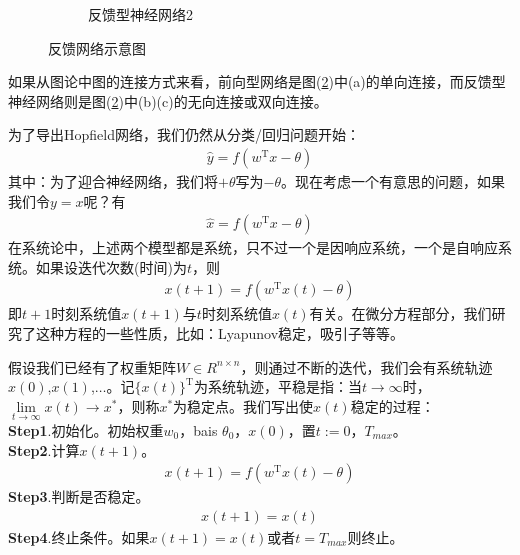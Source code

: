 {\begin{figure}[H]
\begin{subfigure}[b]{0.25\textwidth}
        			\caption{反馈型神经网络2}
        			\label{fig:反馈型神经网络2}
    			\end{subfigure}
    			\caption{反馈网络示意图}\label{fig:反馈网络示意图}
			\end{figure}
            如果从图论中图的连接方式来看，前向型网络是图(\ref{fig:反馈网络示意图})中(a)的单向连接，而反馈型神经网络则是图(\ref{fig:反馈网络示意图})中(b)(c)的无向连接或双向连接。
            \par
            为了导出Hopfield网络，我们仍然从分类/回归问题开始：
            \begin{align*}
            \hat{y} = f(w^\mathrm{T}x-\theta)
            \end{align*}
            其中：为了迎合神经网络，我们将$+\theta$写为$-\theta$。现在考虑一个有意思的问题，如果我们令$y=x$呢？有
            \begin{align*}
            \hat{x} = f(w^\mathrm{T}x-\theta)
            \end{align*}
            在系统论中，上述两个模型都是系统，只不过一个是因响应系统，一个是自响应系统。如果设迭代次数(时间)为$t$，则
            \begin{align*}
            x(t+1) = f(w^\mathrm{T}x(t)-\theta)
            \end{align*}
            即$t+1$时刻系统值$x(t+1)$与$t$时刻系统值$x(t)$有关。在微分方程部分，我们研究了这种方程的一些性质，比如：Lyapunov稳定，吸引子等等。
            \par
            假设我们已经有了权重矩阵$W\in R^{n\times n}$，则通过不断的迭代，我们会有系统轨迹$x(0)$,$x(1)$,$\dots$。记$\{x(t)\}^\mathrm{T}$为系统轨迹，平稳是指：当$t\rightarrow \infty$时，$\lim\limits_{t\rightarrow \infty} x(t)\rightarrow x^*$，则称$x^*$为稳定点。我们写出使$x(t)$稳定的过程：\\
            \textbf{Step1}.初始化。初始权重$w_0$，bais $\theta_0$，$x(0)$，置$t:=0$，$T_{max}$。\\
            \textbf{Step2}.计算$x(t+1)$。
            \begin{align*}
            x(t+1) = f(w^\mathrm{T}x(t)-\theta)
            \end{align*}
            \textbf{Step3}.判断是否稳定。
            \begin{align*}
            x(t+1) = x(t)
            \end{align*}
            \textbf{Step4}.终止条件。如果$x(t+1) = x(t)$或者$t = T_{max}$则终止。
}
